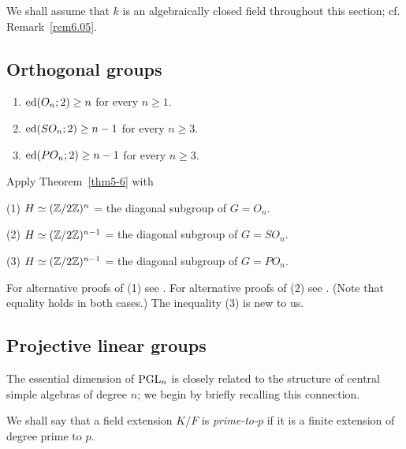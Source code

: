 We shall assume that $k$ is an algebraically closed field throughout
this section; cf. Remark~\ref{rem6.05}.

\subsection*{Orthogonal groups}

\begin{thm} \label{thm6.1-1a}
\begin{enumerate}
\item $\operatorname{ed}(O_n; 2) \geq n$ for every $n \geq 1$.
\item $\operatorname{ed}(SO_n; 2) \geq n-1$ for every $n \geq 3$.
\item $\operatorname{ed}(PO_n; 2) \geq n-1$ for every $n \geq 3$.
\end{enumerate}
\end{thm}

\begin{pf} 
Apply Theorem~\ref{thm5-6} with 

\smallskip
(1) $H \simeq ({\Bbb Z}/2{\Bbb Z})^n$ = the diagonal subgroup of $G = O_n$.

\smallskip
(2) $H \simeq ({\Bbb Z}/2{\Bbb Z})^{n-1}$ = the diagonal subgroup of $G = SO_n$.

\smallskip
(3) $H \simeq ({\Bbb Z}/2{\Bbb Z})^{n-1}$ = the diagonal subgroup of $G = PO_n$.
\end{pf}

\begin{remark} For alternative proofs of (1) see \cite[Theorem 10.3 and
Example 12.6]{r2}. For alternative proofs of (2) see \cite[Theorem 10.4 and
Example 12.7]{r2}. (Note that equality holds in both cases.)
The inequality (3) is new to us. 
\end{remark}

\subsection*{Projective linear groups}

The essential dimension of $\operatorname{PGL}_n$ is closely related to the structure of
central simple algebras of degree $n$; we begin by briefly recalling this
connection. 

We shall say that a field extension $K/F$ is {\em prime-to-}$p$ if
it is a finite extension of degree prime to $p$.

